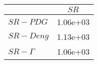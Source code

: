 \begin{tabular}{l|c}
\toprule
{} &     $SR$ \\
\midrule
\textbf{$SR-PDG$   } & 1.06e+03 \\
\textbf{$SR-Deng$  } & 1.13e+03 \\
\textbf{$SR-\Gamma$} & 1.06e+03 \\
\bottomrule
\end{tabular}
